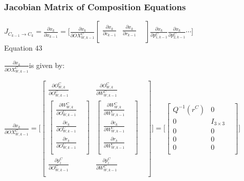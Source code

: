 \subsubsection{Jacobian Matrix of Composition Equations}
$J_{C_{k-1}\to C_{k}}=\frac{\partial x_{k}}{\partial x_{k-1}}=\lbrack 
\frac{\partial x_{k}}{\partial OX_{W, k-1}^{C}}\begin{bmatrix}
\frac{\partial x_{k}}{\partial c_{k-1}} & \frac{\partial x_{k}}{\partial 
r_{k-1}} & \\
\end{bmatrix}
\frac{\partial x_{k}}{\partial p_{1, k-1}^{C}}\frac{\partial 
x_{k}}{\partial p_{2, k-1}^{C}} \cdots \rbrack $\\


Equation 43

$\frac{\partial x_{k}}{\partial OX_{W, k-1}^{C}}$is given by:

$\frac{\partial x_{k}}{\partial OX_{W, k-1}^{C}}=\lbrack \begin{bmatrix}
\frac{\partial O_{W,k}^{C}}{\partial O_{W,k-1}^{C}} & \frac{\partial 
O_{W,k}^{C}}{\partial W_{W,k-1}^{C}} & \\
\begin{bmatrix}
\frac{\partial W_{W,k}^{C}}{\partial O_{W,k-1}^{C}} & \\
\frac{\partial c_{k}}{\partial O_{W,k-1}^{C}} & \\
\frac{\partial r_{k}}{\partial O_{W,k-1}^{C}} & \\
\end{bmatrix}
 & \begin{bmatrix}
\frac{\partial W_{W,k}^{C}}{\partial W_{W,k-1}^{C}} & \\
\frac{\partial c_{k}}{\partial W_{W,k-1}^{C}} & \\
\frac{\partial r_{k}}{\partial W_{W,k-1}^{C}} & \\
\end{bmatrix}
 & \\
\frac{\partial p_{i}^{C}}{\partial O_{W,k-1}^{C}} & \frac{\partial 
p_{i}^{C}}{\partial W_{W,k-1}^{C}} & \\
\end{bmatrix}
\rbrack =\lbrack \begin{bmatrix}
Q^{-1}(r^{C}) & 0 & \\
0 & I_{3\times 3} & \\
0 & 0 & \\
0 & 0 & \\
0 & 0 & \\
\end{bmatrix}
\rbrack $\\



